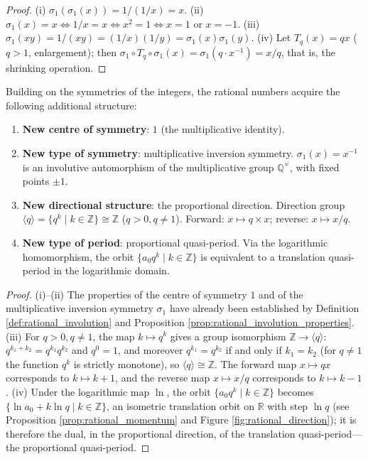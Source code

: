\begin{proof}
(i) $\sigma_1(\sigma_1(x)) = 1/(1/x) = x$.
(ii) $\sigma_1(x) = x \iff 1/x = x \iff x^2 = 1 \iff x = 1$ or $x = -1$.
(iii) $\sigma_1(xy) = 1/(xy) = (1/x)(1/y) = \sigma_1(x) \sigma_1(y)$.
(iv) Let $T_q(x) = qx$ ($q>1$, enlargement); then $\sigma_1 \circ T_q \circ \sigma_1(x) = \sigma_1(q \cdot x^{-1}) = x/q$, that is, the shrinking operation.
\end{proof}

\begin{proposition}\label{prop:rational_direction_period}
Building on the symmetries of the integers, the rational numbers acquire the following additional structure:
\begin{enumerate}[label=(\roman*)]
    \item \textbf{New centre of symmetry}: $1$ (the multiplicative identity).
    \item \textbf{New type of symmetry}: multiplicative inversion symmetry. $\sigma_1(x) = x^{-1}$ is an involutive automorphism of the multiplicative group $\mathbb{Q}^{\times}$, with fixed points $\pm 1$.
    \item \textbf{New directional structure}: the proportional direction. Direction group $\langle q \rangle = \{q^k \mid k \in \mathbb{Z}\} \cong \mathbb{Z}$ ($q > 0, q \neq 1$). Forward: $x \mapsto q \times x$; reverse: $x \mapsto x / q$.
    \item \textbf{New type of period}: proportional quasi-period. Via the logarithmic homomorphism, the orbit $\{a_0 q^k \mid k \in \mathbb{Z}\}$ is equivalent to a translation quasi-period in the logarithmic domain.
\end{enumerate}
\end{proposition}

\begin{proof}
(i)--(ii) The properties of the centre of symmetry $1$ and of the multiplicative inversion symmetry $\sigma_1$ have already been established by Definition \ref{def:rational_involution} and Proposition \ref{prop:rational_involution_properties}.
(iii) For $q > 0, q \neq 1$, the map $k \mapsto q^k$ gives a group isomorphism $\mathbb{Z} \to \langle q \rangle$: $q^{k_1 + k_2} = q^{k_1} q^{k_2}$ and $q^0 = 1$, and moreover $q^{k_1} = q^{k_2}$ if and only if $k_1 = k_2$ (for $q \neq 1$ the function $q^k$ is strictly monotone), so $\langle q \rangle \cong \mathbb{Z}$. The forward map $x \mapsto qx$ corresponds to $k \mapsto k+1$, and the reverse map $x \mapsto x/q$ corresponds to $k \mapsto k-1$.
(iv) Under the logarithmic map $\ln$, the orbit $\{a_0 q^k \mid k \in \mathbb{Z}\}$ becomes $\{\ln a_0 + k \ln q \mid k \in \mathbb{Z}\}$, an isometric translation orbit on $\mathbb{R}$ with step $\ln q$ (see Proposition \ref{prop:rational_momentum} and Figure \ref{fig:rational_direction}); it is therefore the dual, in the proportional direction, of the translation quasi-period---the proportional quasi-period.
\end{proof}

